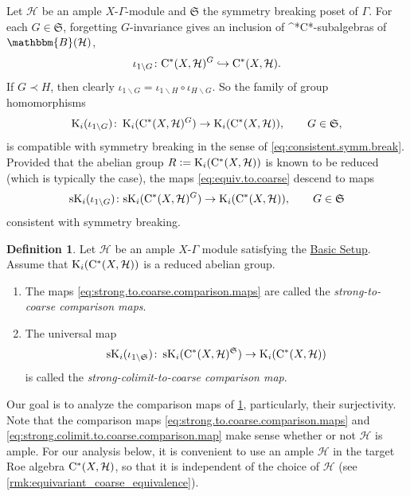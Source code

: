 \documentclass{amsart}
\numberwithin{figure}{section}
\numberwithin{equation}{section}
\numberwithin{table}{section}
\theoremstyle{plain}
\theoremstyle{definition}
\newtheorem{definition}[equation]{Definition}
\theoremstyle{remark}
\theoremstyle{nonumber}
\newcommand{\refbasicsetup}{\hyperref[basic_setup]{Basic Setup}}
\newcommand{\Bdd}{\mathbb{B}}
\newcommand{\K}{\relax\ifmmode\operatorname{K}\else\textup{K}\fi}
\newcommand{\sK}{\operatorname{sK}}
\newcommand{\Cst}{\relax\ifmmode\mathrm{C}^*\else\textup{C*}\fi}
\newcommand{\defeq}{\mathrel{\vcentcolon=}}
\renewcommand{\mathbb}{\mathbbm} %
\begin{document}
\medskip
Let \( \mathcal{H} \) be an ample \( X \)-\( \Gamma \)-module and \(
\mathfrak{S} \) the symmetry breaking poset of \( \Gamma \). For each \(
G\in\mathfrak{S} \),
forgetting \( G \)-invariance gives
an inclusion of \Cst-subalgebras of \( \Bdd(\mathcal{H}) \), 
\[ 
  \iota_{1\backslash G}\colon
  \Cst(X,\mathcal{H})^G\hookrightarrow \Cst(X,\mathcal{H}).
\]
If \( G\prec H \), then clearly \( \iota_{1\backslash
G}=\iota_{1\backslash H}\circ\iota_{H\backslash G} \). So the family of group
homomorphisms 
\begin{equation}\label{eq:equiv.to.coarse}
\K_i(\iota_{1\backslash G})\colon \K_i(\Cst(X,\mathcal{H})^G)\to \K_i(\Cst(X,\mathcal{H})),\qquad G\in\mathfrak{S},
\end{equation}
is compatible with symmetry breaking in the sense of
\eqref{eq:consistent.symm.break}. Provided that the abelian group
$R\defeq\K_i(\Cst(X,\mathcal{H}))$ is known to be reduced (which
is typically the case), the
maps \eqref{eq:equiv.to.coarse} descend to maps
\begin{equation}\label{eq:strong.to.coarse.comparison.maps}
{\rm sK}_i(\iota_{1\backslash G})\colon {\rm sK}_i(\Cst(X,\mathcal{H})^G)\to \K_i(\Cst(X,\mathcal{H})),\qquad G\in\mathfrak{S}
\end{equation}
consistent with symmetry breaking.

\begin{definition}\label{dfn:strong.to.coarse.comparison}
Let $\mathcal{H}$ be an ample $X$-$\Gamma$ module satisfying the
\refbasicsetup.
Assume that $\K_i(\Cst(X,\mathcal{H}))$ is a reduced abelian group. 
\begin{enumerate}
\item The maps \eqref{eq:strong.to.coarse.comparison.maps} are called the
\emph{strong-to-coarse comparison maps}. 
\item The universal map
\begin{equation}\label{eq:strong.colimit.to.coarse.comparison.map}
\sK_i(\iota_{1\backslash \mathfrak{S}})\colon \sK_i(\Cst(X,\mathcal{H})^\mathfrak{S})\to \K_i(\Cst(X,\mathcal{H}))
\end{equation}
is called the \emph{strong-colimit-to-coarse comparison map}.
\end{enumerate}
\end{definition}


Our goal is to analyze the comparison maps of \cref{dfn:strong.to.coarse.comparison}, particularly, their surjectivity. 
Note that the comparison maps
\eqref{eq:strong.to.coarse.comparison.maps} and
\eqref{eq:strong.colimit.to.coarse.comparison.map}
make sense whether or not $\mathcal{H}$ is ample. For our analysis below,
it is convenient to use an ample $\mathcal{H}$ in the target Roe algebra
$\Cst(X,\mathcal{H})$, so that it is independent of the choice of
$\mathcal{H}$ (see \cref{rmk:equivariant_coarse_equivalence}).
\end{document}
